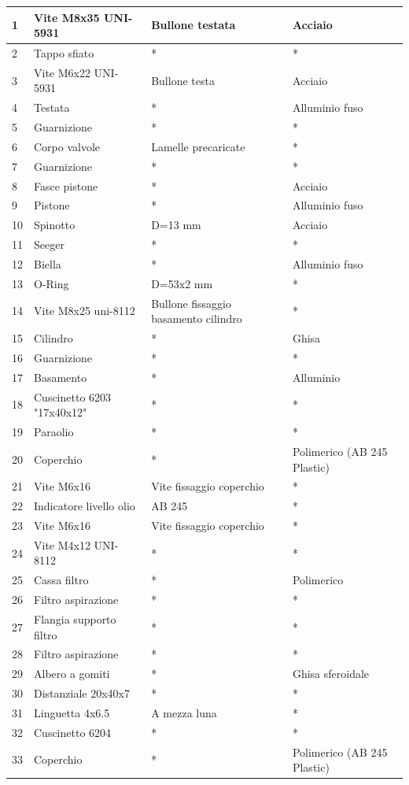 \begin{tabular}{|l|l|l|l|}
\hline
1&Vite M8x35 UNI-5931&Bullone testata&Acciaio\\
\hline
2&Tappo sfiato&*&*\\
\hline
3&Vite M6x22 UNI-5931&Bullone testa&Acciaio\\
\hline
4&Testata&*&Alluminio fuso\\
\hline
5&Guarnizione&*&*\\
\hline
6&Corpo valvole&Lamelle precaricate&*\\
\hline
7&Guarnizione&*&*\\
\hline
8&Fasce pistone&*&Acciaio\\
\hline
9&Pistone&*&Alluminio fuso\\
\hline
10&Spinotto&D=13 mm&Acciaio\\
\hline
11&Seeger&*&*\\
\hline
12&Biella&*&Alluminio fuso\\
\hline
13&O-Ring&D=53x2 mm&*\\
\hline
14&Vite M8x25 uni-8112&Bullone fissaggio basamento cilindro&*\\
\hline
15&Cilindro&*&Ghisa\\
\hline
16&Guarnizione&*&*\\
\hline
17&Basamento&*&Alluminio\\
\hline
18&Cuscinetto 6203 "17x40x12"&*&*\\
\hline
19&Paraolio&*&*\\
\hline
20&Coperchio&*&Polimerico (AB 245 Plastic)\\
\hline
21&Vite M6x16&Vite fissaggio coperchio&*\\
\hline
22&Indicatore livello olio&AB 245&*\\
\hline
23&Vite M6x16&Vite fissaggio coperchio&*\\
\hline
24&Vite M4x12 UNI-8112&*&*\\
\hline
25&Cassa filtro&*&Polimerico\\
\hline
26&Filtro aspirazione&*&*\\
\hline
27&Flangia supporto filtro&*&*\\
\hline
28&Filtro aspirazione&*&*\\
\hline
29&Albero a gomiti&*&Ghisa sferoidale\\
\hline
30&Distanziale 20x40x7&*&*\\
\hline
31&Linguetta 4x6.5&A mezza luna&*\\
\hline
32&Cuscinetto 6204&*&*\\
\hline
33&Coperchio&*&Polimerico (AB 245 Plastic)\\

\end{tabular}
